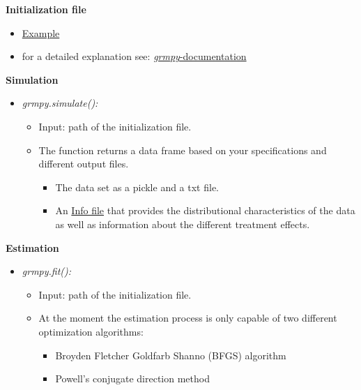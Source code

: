 \begin{frame}
\textbf{Initialization file}

\medskip
\begin{itemize}
\item \href{examples/tutorial.grmpy.yml}{Example}
\item for a detailed explanation see: \href{http://grmpy.readthedocs.io/en/latest/tutorial.html}{\textit{grmpy}-documentation}
\end{itemize}
\vfill
\end{frame}

\begin{frame}
\textbf{Simulation}

\medskip
\begin{itemize}\setlength\itemsep{1em}
\item \textit{grmpy.simulate():}

\medskip
\begin{itemize}\setlength\itemsep{1em}
\item Input: path of the initialization file.
\item The function returns a data frame based on your specifications and different output files.

\medskip
\begin{itemize}\setlength\itemsep{1em}
\item The data set as a pickle and a txt file.
\item An \href{examples/data.grmpy.info}{Info file} that provides the distributional characteristics of the data as well as information about the different treatment effects.
\end{itemize}

\end{itemize}
\end{itemize}
\end{frame}

\begin{frame}
\textbf{Estimation}

\medskip
\begin{itemize}\setlength\itemsep{1em}
\item \textit{grmpy.fit():}\medskip
  \begin{itemize}\setlength\itemsep{1em}
  \item Input: path of the initialization file.
  \item At the moment the estimation process is only capable of two different optimization algorithms:

  \medskip
    \begin{itemize}\setlength\itemsep{1em}
    \item Broyden Fletcher Goldfarb Shanno (BFGS) algorithm
    \item  Powell's conjugate direction method
\end{itemize}
\end{itemize}
\end{itemize}

\end{frame}

